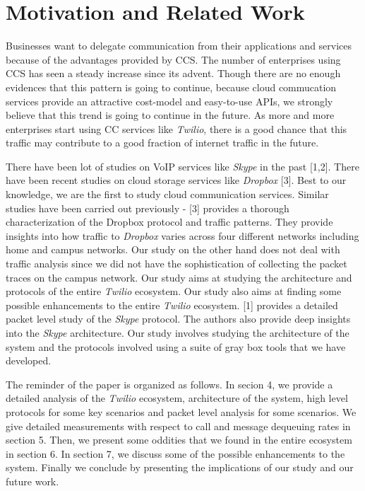 \section{Motivation and Related Work}
\label{sec-motivationandrelated}
Businesses want to delegate communication from their applications and services because of the advantages provided by CCS. The number of enterprises using CCS has seen a steady increase since its advent. Though there are no enough evidences that this pattern is going to continue, because cloud commucation services provide an attractive cost-model and easy-to-use APIs, we strongly believe that this trend is going to continue in the future. As more and more enterprises start using CC services like \textit{Twilio}, there is a good chance that this traffic may contribute to a good fraction of internet traffic in the future. \par
There have been lot of studies on VoIP services like \textit{Skype} in the past [1,2]. There have been recent studies on cloud storage services like \textit{Dropbox} [3]. Best to our knowledge, we are the first to study cloud communication services. Similar studies have been carried out previously - [3] provides a thorough characterization of the Dropbox protocol and traffic patterns. They provide insights into how traffic to \textit{Dropbox} varies across four different networks including home and campus networks. Our study on the other hand does not deal with traffic analysis since we did not have the sophistication of collecting the packet traces on the campus network. Our study aims at studying the architecture and protocols of the entire \textit{Twilio} ecosystem. Our study also aims at finding some possible enhancements to the entire \textit{Twilio} ecosystem. [1] provides a detailed packet level study of the \textit{Skype} protocol. The authors also provide deep insights into the \textit{Skype} architecture. Our study involves studying the architecture of the system and the protocols involved using a suite of gray box tools that we have developed. \par
The reminder of the paper is organized as follows. In secion 4, we provide a detailed analysis of the \textit{Twilio} ecosystem, architecture of the system, high level protocols for some key scenarios and packet level analysis for some scenarios. We give detailed measurements with respect to call and message dequeuing rates in section 5. Then, we present some oddities that we found in the entire ecosystem in section 6. In section 7, we discuss some of the possible enhancements to the system. Finally we conclude by presenting the implications of our study and our future work.